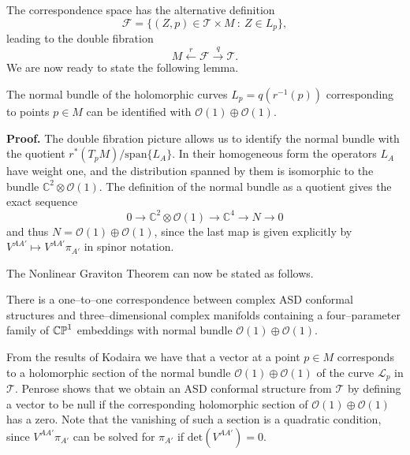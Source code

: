 The correspondence space has the alternative definition
\[
\mathcal{F}=\{(Z,p)\in \mathscr{T}\times M \ :\  Z\in L_p\},
\]
leading to the double fibration
\[
M\xleftarrow{r}\mathcal{F}\xrightarrow{q}\mathscr{T}.
\]
We are now ready to state the following lemma.

\begin{lemma}
The normal bundle of the holomorphic curves $L_p=q(r^{-1}(p))$ corresponding to points $p\in M$ can be identified with $\mathcal{O}(1)\oplus\mathcal{O}(1)$.
\end{lemma}
\noindent
{\bf Proof.} The double fibration picture allows us to identify the normal bundle with the quotient $r^*(T_pM)/\mathrm{span}\{L_A\}$. In their homogeneous form the operators $L_A$ have weight one, and the distribution spanned by them is isomorphic to the bundle $\mathbb{C}^2\otimes\mathcal{O}(1)$. The definition of the normal bundle as a quotient gives the exact sequence
\[
0\rightarrow \mathbb{C}^2\otimes\mathcal{O}(1)\rightarrow\mathbb{C}^4\rightarrow N\rightarrow 0
\]
and thus $N=\mathcal{O}(1)\oplus\mathcal{O}(1)$, since the last map is given explicitly by $V^{AA'}\mapsto V^{AA'}\pi_{A'}$ in spinor notation.
\koniec

The Nonlinear Graviton Theorem can now be stated as follows.
\begin{theo}
There is a one--to--one correspondence between complex ASD conformal structures and three--dimensional complex manifolds containing a four--parameter family of $\mathbb{CP}^1$ embeddings with normal bundle $\mathcal{O}(1)\oplus\mathcal{O}(1)$.
\end{theo}
\noindent
From the results of Kodaira \cite{Kodaira} we have that a vector at a point $p\in M$ corresponds to a holomorphic section of the normal bundle $\mathcal{O}(1)\oplus\mathcal{O}(1)$ of the curve $\mathscr{L}_p$ in $\mathscr{T}$. Penrose shows that we obtain an ASD conformal structure from $\mathscr{T}$ by defining a vector to be null if the corresponding holomorphic section of $\mathcal{O}(1)\oplus\mathcal{O}(1)$ has a zero. Note that the vanishing of such a section is a quadratic condition, since $V^{AA'}\pi_{A'}$ can be solved for $\pi_{A'}$ if $\mathrm{det}(V^{AA'})=0$.


